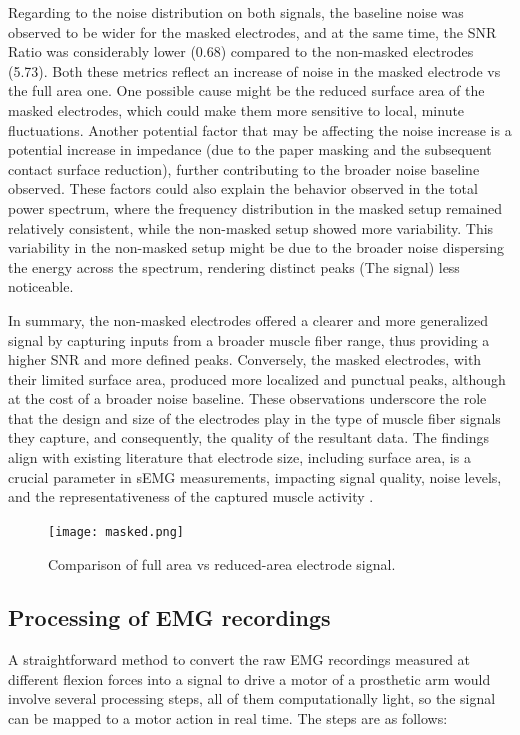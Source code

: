 \documentclass[conference]{IEEEtran}
\begin{document}
Regarding to the noise distribution on both signals,
the baseline noise was observed to be wider for the masked 
electrodes, and at the same time, the SNR Ratio was considerably lower (0.68) compared to the non-masked 
electrodes (5.73). Both these metrics reflect an increase of noise 
in the masked electrode vs the full area one. One possible cause 
might be the reduced surface area of the masked electrodes, 
which could make them more sensitive to local, minute 
fluctuations. Another potential factor that may be affecting the 
noise increase is a potential increase in impedance (due to the 
paper masking and the subsequent contact surface reduction), further contributing to the 
broader noise baseline observed. These factors could also 
explain the behavior observed in the total power spectrum, 
where the frequency distribution in the masked 
setup remained relatively consistent, while the non-masked setup 
showed more variability. This variability in the non-masked 
setup might be due to the broader noise dispersing the energy 
across the spectrum, rendering distinct peaks (The signal) less noticeable.

In summary, the non-masked electrodes offered a clearer and more 
generalized signal by capturing inputs from a broader muscle 
fiber range, thus providing a higher SNR and more defined peaks. 
Conversely, the masked electrodes, with their limited surface 
area, produced more localized and punctual peaks, although at 
the cost of a broader noise baseline. These observations underscore the 
role that the design and size of the electrodes play in the 
type of muscle fiber signals they capture, and consequently, 
the quality of the resultant data. The findings align with 
existing literature that electrode size, including surface 
area, is a crucial parameter in sEMG measurements, impacting 
signal quality, noise levels, and the representativeness of the 
captured muscle activity \cite{hermensDevelopmentRecommendationsSEMG2000,merlettiTutorialSurfaceEMG2020}.

\begin{figure}[t]
   \centering
   \texttt{[image: masked.png]}
   \caption{Comparison of full area vs reduced-area electrode signal.}
   \label{fig:masked}
\end{figure}

\subsection{Processing of EMG recordings}
A straightforward method to convert the raw EMG recordings 
measured at different flexion forces into a signal to drive a 
motor of a prosthetic arm would involve several processing steps,
all of them computationally light, so the signal can be mapped to a motor action in real time. The steps are as follows:
\end{document}
